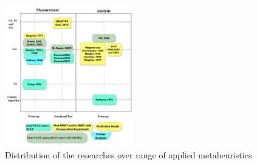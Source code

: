 %
%

\begin{figure}[h]
\centering
\includegraphics[width=0.5\textwidth]{./images/comparativo.png}
\caption{
Distribution of the researches over range of applied metaheuristics}
\label{fig:comparison}
\end{figure}


